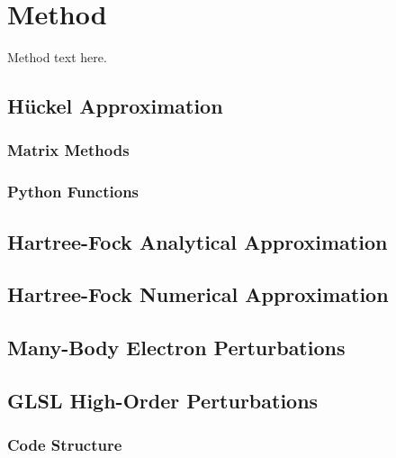 \chapter{Method}\label{ch:method}

Method text here.

\section{Hückel Approximation}\label{sec:huckelmethod}
\subsection{Matrix Methods}\label{subsec:matrixmethods}
\subsection{Python Functions}\label{subsec:pythonfunctions}
\section{Hartree-Fock Analytical Approximation}\label{sec:hartreeanalytic}
\section{Hartree-Fock Numerical Approximation}\label{sec:hartreenumerical}
\section{Many-Body Electron Perturbations}\label{sec:electronperturbation}
\section{GLSL High-Order Perturbations}\label{sec:GLSLhighorder}
\subsection{Code Structure}\label{subsec:codestructure}
